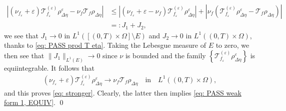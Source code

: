 \documentclass[10pt, reqno]{amsart}
\theoremstyle{plain}
\theoremstyle{definition}
\theoremstyle{remark}
\renewenvironment{proof}[1][\proofname]{\noindent{\scshape #1.\quad}}{\qed}
\numberwithin{equation}{section}
\newcommand{\calT}{\mathcal T}
\newcommand{\ve}{\varepsilon}
\newcommand{\lt}{\left}
\newcommand{\rt}{\right}
\begin{document}
\begin{proof}
\begin{equation} \label{eq: j1 j2}
\begin{split}
     \lt|(\nu_{f_\ve} + \ve) \calT_{f_\ve}^{(\ve)} \rho_{\Delta\eta}^\ve - \nu_f \calT_f \rho_{\Delta\eta} \rt|  
    &\le \lt| (\nu_{f_\ve} + \ve - \nu_f)  \calT_{f_\ve}^{(\ve)} \rho_{\Delta\eta}^\ve \rt| + \lt|\nu_f \lt( \calT_{f_\ve}^{(\ve)} \rho_{\Delta\eta}^\ve - \calT_f \rho_{\Delta\eta} \rt) \rt|\\
    &=: J_1 + J_2,
\end{split}
\end{equation}
we see that $J_1\to 0$ in $L^1([(0,T)\times\Omega]\setminus E)$ and $J_2\to 0$ in $L^1((0,T)\times\Omega)$, thanks to \eqref{eq: PASS prod T eta}. Taking the Lebesgue measure of $E$ to zero, we then see that $\|J_1\|_{L^1(E)}\to 0$ since $\nu$ is bounded and the family $\lt\{\calT_{f_\ve}^{(\ve)} \rho_{\Delta\eta}^\ve\rt\}$ is equiintegrable. It follows that
\begin{align*}
    (\nu_{f_\ve} + \ve) \calT_{f_\ve}^{(\ve)} \rho_{\Delta\eta}^\ve \to \nu_f \calT_f \rho_{\Delta\eta} \quad \text{in}\quad L^1((0,T)\times \Omega),
\end{align*}
and this proves \eqref{eq: stronger}. Clearly, the latter then implies \eqref{eq: PASS weak form 1, EQUIV}.
\end{proof}
\end{document}
